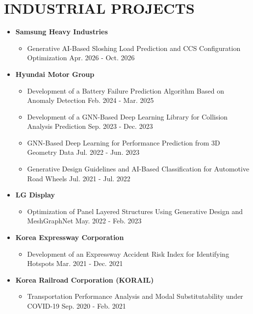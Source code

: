 \documentclass[a4paper,10pt]{article}
\begin{document}
\section*{INDUSTRIAL PROJECTS}
\begin{itemize}[left=0pt]
    \item \textbf{Samsung Heavy Industries}
    \begin{itemize}
        \item[] Generative AI-Based Sloshing Load Prediction and CCS Configuration Optimization    \hfill Apr. 2026 - Oct. 2026
    \end{itemize}
    \item \textbf{Hyundai Motor Group}
    \begin{itemize}
        \item[] Development of a Battery Failure Prediction Algorithm Based on Anomaly Detection   \hfill Feb. 2024 - Mar. 2025
        \item[] Development of a GNN-Based Deep Learning Library for Collision Analysis Prediction \hfill Sep. 2023 - Dec. 2023
        \item[] GNN-Based Deep Learning for Performance Prediction from 3D Geometry Data           \hfill Jul. 2022 - Jun. 2023
        \item[] Generative Design Guidelines and AI-Based Classification for Automotive Road Wheels \hfill Jul. 2021 - Jul. 2022
    \end{itemize}
    \item \textbf{LG Display}
    \begin{itemize}
        \item[] Optimization of Panel Layered Structures Using Generative Design and MeshGraphNet  \hfill May. 2022 - Feb. 2023
    \end{itemize}
    \item \textbf{Korea Expressway Corporation}
    \begin{itemize}
        \item[] Development of an Expressway Accident Risk Index for Identifying Hotspots          \hfill Mar. 2021 - Dec. 2021
    \end{itemize}
    \item \textbf{Korea Railroad Corporation (KORAIL)}
    \begin{itemize}
        \item[] Transportation Performance Analysis and Modal Substitutability under COVID-19      \hfill Sep. 2020 - Feb. 2021
    \end{itemize}
\end{itemize}
\end{document}
